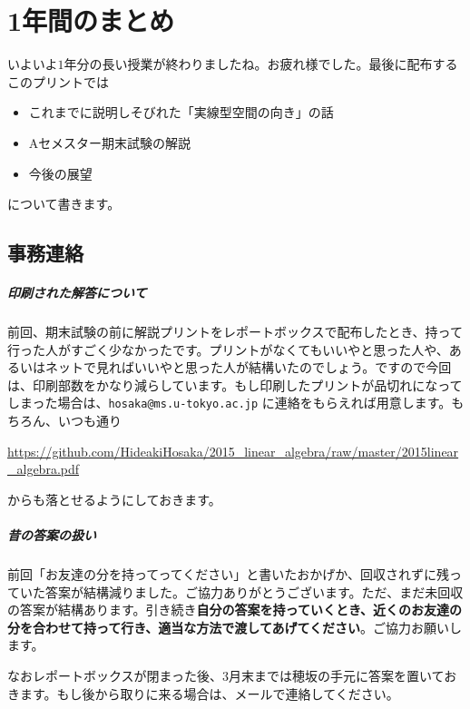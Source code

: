 \chapter{1年間のまとめ}

いよいよ$1$年分の長い授業が終わりましたね。お疲れ様でした。最後に配布するこのプリントでは
\begin{itemize}
\item これまでに説明しそびれた「実線型空間の向き」の話
\item Aセメスター期末試験の解説
\item 今後の展望
\end{itemize}
について書きます。

\section{事務連絡}

\paragraph{印刷された解答について}

前回、期末試験の前に解説プリントをレポートボックスで配布したとき、持って行った人がすごく少なかったです。プリントがなくてもいいやと思った人や、あるいはネットで見ればいいやと思った人が結構いたのでしょう。ですので今回は、印刷部数をかなり減らしています。もし印刷したプリントが品切れになってしまった場合は、\texttt{hosaka@ms.u-tokyo.ac.jp} に連絡をもらえれば用意します。もちろん、いつも通り
\begin{center}
\url{https://github.com/HideakiHosaka/2015_linear_algebra/raw/master/2015linear_algebra.pdf}
\end{center}
からも落とせるようにしておきます。

\paragraph{昔の答案の扱い}

前回「お友達の分を持ってってください」と書いたおかげか、回収されずに残っていた答案が結構減りました。ご協力ありがとうございます。ただ、まだ未回収の答案が結構あります。引き続き\textbf{自分の答案を持っていくとき、近くのお友達の分を合わせて持って行き、適当な方法で渡してあげてください}。ご協力お願いします。

なおレポートボックスが閉まった後、3月末までは穂坂の手元に答案を置いておきます。もし後から取りに来る場合は、メールで連絡してください。

